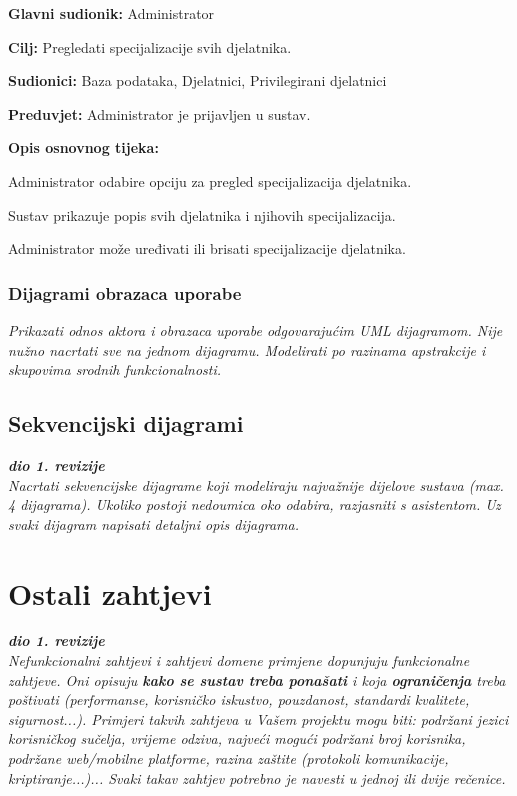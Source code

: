 	\item \textbf{Glavni sudionik:} Administrator
	\item \textbf{Cilj:} Pregledati specijalizacije svih djelatnika.
	\item \textbf{Sudionici:} Baza podataka, Djelatnici, Privilegirani djelatnici
	\item \textbf{Preduvjet:} Administrator je prijavljen u sustav.
	\item \textbf{Opis osnovnog tijeka:}
	\begin{packed_enum}
		\item Administrator odabire opciju za pregled specijalizacija djelatnika.
		\item Sustav prikazuje popis svih djelatnika i njihovih specijalizacija.
		\item Administrator može uređivati ili brisati specijalizacije djelatnika.
	\end{packed_enum}
\closeusecase


\subsubsection{Dijagrami obrazaca uporabe}

\textit{Prikazati odnos aktora i obrazaca uporabe odgovarajućim UML dijagramom. Nije nužno nacrtati sve na jednom dijagramu. Modelirati po razinama apstrakcije i skupovima srodnih funkcionalnosti.}
\eject

\subsection{Sekvencijski dijagrami}

\textbf{\textit{dio 1. revizije}}\\

\textit{Nacrtati sekvencijske dijagrame koji modeliraju najvažnije dijelove sustava (max. 4 dijagrama). Ukoliko postoji nedoumica oko odabira, razjasniti s asistentom. Uz svaki dijagram napisati detaljni opis dijagrama.}
\eject

\section{Ostali zahtjevi}

\textbf{\textit{dio 1. revizije}}\\

\textit{Nefunkcionalni zahtjevi i zahtjevi domene primjene dopunjuju funkcionalne zahtjeve. Oni opisuju \textbf{kako se sustav treba ponašati} i koja \textbf{ograničenja} treba poštivati (performanse, korisničko iskustvo, pouzdanost, standardi kvalitete, sigurnost...). Primjeri takvih zahtjeva u Vašem projektu mogu biti: podržani jezici korisničkog sučelja, vrijeme odziva, najveći mogući podržani broj korisnika, podržane web/mobilne platforme, razina zaštite (protokoli komunikacije, kriptiranje...)... Svaki takav zahtjev potrebno je navesti u jednoj ili dvije rečenice.}
			 
			 
			 
	